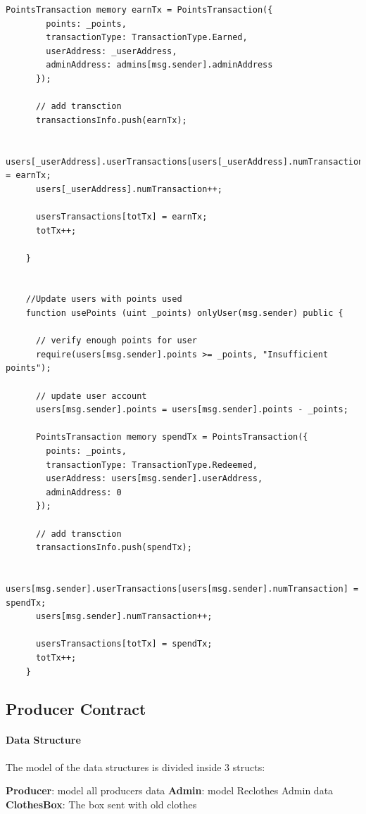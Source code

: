 {\begin{lstlisting}[language=Solidity]
      PointsTransaction memory earnTx = PointsTransaction({
        points: _points,
        transactionType: TransactionType.Earned,
        userAddress: _userAddress,
        adminAddress: admins[msg.sender].adminAddress
      });

      // add transction
      transactionsInfo.push(earnTx);

      users[_userAddress].userTransactions[users[_userAddress].numTransaction] = earnTx;
      users[_userAddress].numTransaction++;

      usersTransactions[totTx] = earnTx;
      totTx++;

    }


    //Update users with points used
    function usePoints (uint _points) onlyUser(msg.sender) public {

      // verify enough points for user
      require(users[msg.sender].points >= _points, "Insufficient points");

      // update user account
      users[msg.sender].points = users[msg.sender].points - _points;

      PointsTransaction memory spendTx = PointsTransaction({
        points: _points,
        transactionType: TransactionType.Redeemed,
        userAddress: users[msg.sender].userAddress,
        adminAddress: 0
      });

      // add transction
      transactionsInfo.push(spendTx);

      users[msg.sender].userTransactions[users[msg.sender].numTransaction] = spendTx;
      users[msg.sender].numTransaction++;

      usersTransactions[totTx] = spendTx;
      totTx++;
    }
\end{lstlisting}


\subsection{Producer Contract}

\paragraph{Data Structure}
The model of the data structures is divided inside 3 structs:

\begin{outline}[enumerate]
    \1 \textbf{Producer}: model all producers data
    \1 \textbf{Admin}: model Reclothes Admin data
    \1 \textbf{ClothesBox}: The box sent with old clothes 
\end{outline}

}
